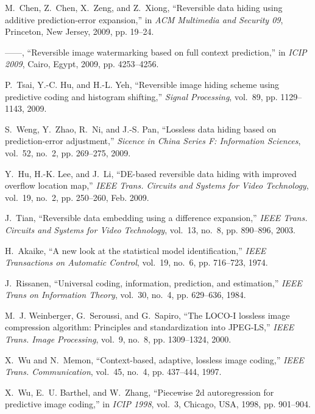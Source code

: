 \documentclass[journal]{IEEEtran}
\begin{document}
\begin{thebibliography}{10}
M.~Chen, Z.~Chen, X.~Zeng, and Z.~Xiong, ``Reversible data hiding using
  additive prediction-error expansion,'' in \emph{ACM Multimedia and Security
  09}, Princeton, New Jersey, 2009, pp. 19--24.

------, ``Reversible image watermarking based on full context prediction,'' in
  \emph{ICIP 2009}, Cairo, Egypt, 2009, pp. 4253--4256.

P.~Tsai, Y.-C. Hu, and H.-L. Yeh, ``Reversible image hiding scheme using
  predictive coding and histogram shifting,'' \emph{Signal Processing},
  vol.~89, pp. 1129--1143, 2009.

S.~Weng, Y.~Zhao, R.~Ni, and J.-S. Pan, ``Lossless data hiding based on
  prediction-error adjustment,'' \emph{Sicence in China Series F: Information
  Sciences}, vol.~52, no.~2, pp. 269--275, 2009.

Y.~Hu, H.-K. Lee, and J.~Li, ``\uppercase{DE}-based reversible data hiding with
  improved overflow location map,'' \emph{IEEE Trans. Circuits and Systems for
  Video Technology}, vol.~19, no.~2, pp. 250--260, Feb. 2009.

J.~Tian, ``Reversible data embedding using a difference expansion,'' \emph{IEEE
  Trans. Circuits and Systems for Video Technology}, vol.~13, no.~8, pp.
  890--896, 2003.

H.~Akaike, ``A new look at the statistical model identification,'' \emph{IEEE
  Transactions on Automatic Control}, vol.~19, no.~6, pp. 716--723, 1974.

J.~Rissanen, ``Universal coding, information, prediction, and estimation,''
  \emph{IEEE Trans on Information Theory}, vol.~30, no.~4, pp. 629--636, 1984.

M.~J. Weinberger, G.~Seroussi, and G.~Sapiro, ``The \uppercase{LOCO-I} lossless
  image compression algorithm: Principles and standardization into
  \uppercase{JPEG-LS},'' \emph{IEEE Trans. Image Processing}, vol.~9, no.~8,
  pp. 1309--1324, 2000.

X.~Wu and N.~Memon, ``Context-based, adaptive, lossless image coding,''
  \emph{IEEE Trans. Communication}, vol.~45, no.~4, pp. 437--444, 1997.

X.~Wu, E.~U. Barthel, and W.~Zhang, ``Piecewise 2d autoregression for
  predictive image coding,'' in \emph{ICIP 1998}, vol.~3, Chicago, USA, 1998,
  pp. 901--904.


\end{thebibliography}
\end{document}
